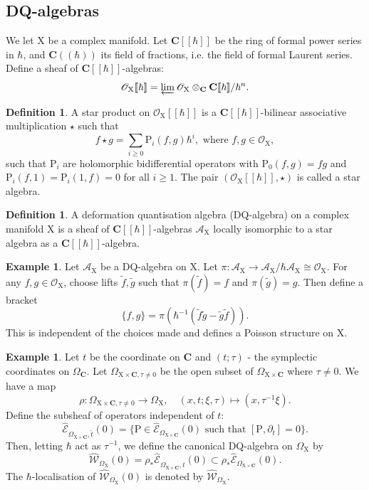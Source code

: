 \documentclass{article}
\theoremstyle{plain}
\theoremstyle{definition}
\newtheorem{definition}[theorem]{Definition}
\newtheorem{example}[theorem]{Example}
\theoremstyle{remark}
\newcommand{\mr}{\mathrm}
\newcommand{\C}{\mathbf C}
\newcommand{\brak}{[\![\hbar]\!]}
\newcommand{\cbrak}{(\!(\hbar)\!)}
\newcommand{\3}{\vspace{3mm}}
\newcommand{\2}{\vspace{2mm}}
\newcommand{\1}{\vspace{1mm}}
\begin{document}
\subsection{DQ-algebras}
We let $\mr{X}$ be a complex manifold. Let $\C\brak$ be the ring of formal power series in $\hbar$, and $\C\cbrak$ its field of fractions, i.e. the field of formal Laurent series. Define a sheaf of $\C\brak$-algebras: $$\mathscr{O}_\mr{X}[\![\hbar]\!] = \varprojlim \mathscr{O}_\mr{X} \otimes_{\C} \C[\![\hbar]\!]/\hbar^{n}.$$
\begin{definition}
 A star product on $\mathscr{O}_\mr{X}[\![\hbar]\!]$ is a $\C\brak$-bilinear associative multiplication $\star$ such that $$f\star g = \sum_{i\ge 0} \mr{P}_i(f,g)\hbar^{i}, \text{ where } f,g \in \mathscr{O}_\mr{X},$$ such that $\mr{P}_i$ are holomorphic bidifferential operators with $\mr{P}_{0}(f,g)=fg$ and $\mr{P}_{i}(f,1) = \mr{P}_i(1,f)=0$ for all $i \ge 1$. The pair $(\mathscr{O}_\mr{X}[\![\hbar]\!],\star)$ is called a star algebra.
\end{definition}
\2
\begin{definition}
 A deformation quantisation algebra (DQ-algebra) on a complex manifold $\mr{X}$ is a sheaf of $\C\brak$-algebras $\mathscr{A}_\mr{X}$ locally isomorphic to a star algebra as a $\C\brak$-algebra.
\end{definition}
\2
\begin{example}\label{Poissonexample}
 Let $\mathscr{A}_\mr{X}$ be a DQ-algebra on $\mr{X}$. Let $\pi : \mathscr{A}_\mr{X} \to \mathscr{A}_\mr{X}/\hbar\mathscr{A}_\mr{X} \cong \mathscr{O}_\mr{X}$. For any $f,g \in \mathscr{O}_\mr{X}$, choose lifts $\tilde{f}, \tilde{g}$ such that $\pi(\tilde{f})=f$ and $\pi(\tilde{g})=g$. Then define a bracket $$\{f,g\} = \pi(\hbar^{-1}(\tilde{f}\tilde{g}-\tilde{g}\tilde{f})).$$ This is independent of the choices made and defines a Poisson structure on $\mr{X}$.
\end{example}
\2
\begin{example}
 Let $t$ be the coordinate on $\C$ and $(t;\tau)$ - the symplectic coordinates on $\Omega_{\C}$. Let $\Omega_{\mr{X}\times \C,\tau\not=0}$ be the open subset of $\Omega_{\mr{X}\times \C}$ where $\tau\not=0$. We have a map $$\rho : \Omega_{\mr{X}\times \C,\tau\not=0} \to \Omega_{\mr{X}}, \quad (x,t;\xi,\tau) \mapsto (x,\tau^{-1}\xi).$$ Define the subsheaf of operators independent of $t$: $$\widehat{\mathscr{E}}_{\Omega_{\mr{X}\times \C},\widehat{t}}(0)= \{\mr{P} \in \widehat{\mathscr{E}}_{\Omega_{\mr{X}\times \C}}(0) \text{ such that } [\mr{P},\partial_{t}]=0\}.$$ Then, letting $\hbar$ act as $\tau^{-1}$, we define the canonical DQ-algebra on $\Omega_{\mr{X}}$ by $$\widehat{\mathscr{W}}_{\Omega_\mr{X}}(0) = \rho_{*}\widehat{\mathscr{E}}_{\Omega_{\mr{X}\times \C},\widehat{t}}(0)\subset \rho_{*}\widehat{\mathscr{E}}_{\Omega_{\mr{X}\times \C}}(0).$$ The $\hbar$-localisation of $\widehat{\mathscr{W}}_{\Omega_\mr{X}}(0)$ is denoted by $\widehat{\mathscr{W}}_{\Omega_\mr{X}}$.
\end{example}
\end{document}
